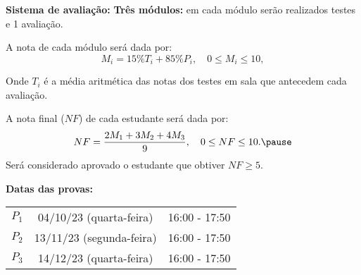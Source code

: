 \documentclass{beamer}
\begin{document}
    \begin{frame}
        {\bf{Sistema de avaliação:}} \textbf{Três módulos:} em cada módulo serão realizados testes e 1 avaliação.\pause

        A nota de cada módulo será dada por:
        \[
            M_i = 15\%T_i + 85\%P_i, \quad 0 \le M_i \le 10,
        \]

        Onde $T_i$ é a média aritmética das notas dos testes em sala que antecedem cada avaliação.\pause

        A nota final ($NF$) de cada estudante ser\'a dada por:\pause
        \[
            NF = \dfrac{2M_1 + 3M_2 + 4M_3}{9}, \quad 0 \le NF \le 10.\pause
        \]
        Ser\'a considerado aprovado o estudante que obtiver $NF \ge 5$.
    \end{frame}

    \begin{frame}
        {\bf Datas das provas:}
        \begin{center}
            \begin{tabular}{c|c|c}
                \hline\hline
                \hspace{0.5cm}{\bf Prova}\hspace{0.5cm} & \hspace{1cm}{\bf Data}\hspace{1cm} & \hspace{1cm}{\bf Hor\'{a}rio}\hspace{1cm} \\
                \hline\hline
                $P_1$ & 04/10/23 (quarta-feira) \phantom{x} & 16:00 - 17:50 \\
                \hline
                $P_2$ & 13/11/23 (segunda-feira) \phantom{x} & 16:00 - 17:50 \\
                \hline
                $P_3$ & 14/12/23 (quarta-feira) \phantom{x} & 16:00 - 17:50 \\
                \hline\hline
            \end{tabular}
        \end{center}
    \end{frame}
\end{document}
